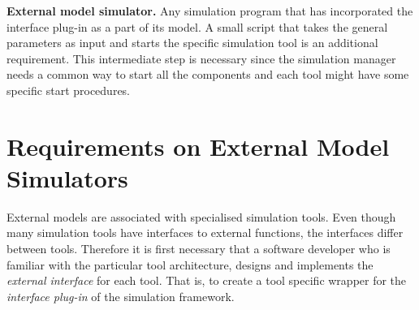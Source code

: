 \textbf{External model simulator.} 
Any simulation program that has incorporated the interface plug-in as a part of its model. 
A small script that takes the general parameters as input and starts the specific simulation tool is an additional requirement. 
This intermediate step is necessary since the simulation manager needs a common way to start all the components and each tool might have some specific start procedures.

\section{Requirements on External Model Simulators}
\label{sec:requirements}
External models are associated with specialised simulation tools. 
Even though many simulation tools have interfaces to external functions, the interfaces differ between tools. 
Therefore it is first necessary that a software developer who is familiar with the particular tool architecture, designs and implements the {\em external interface} for each tool. 
That is, to create a tool specific wrapper for the {\em interface plug-in} of the simulation framework.

